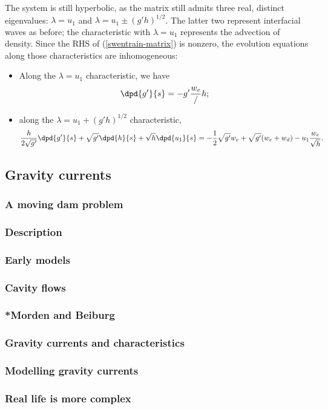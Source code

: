 The system is still hyperbolic, as the matrix still admits three real, distinct eigenvalues: $\lambda = u_1$ and $\lambda = u_1 \pm (g'h)^{1/2}$. The latter two represent interfacial waves as before; the characteristic with $\lambda = u_1$ represents the advection of density. Since the RHS of (\ref{swentrain-matrix}) is nonzero, the evolution equations along those characteristics are inhomogeneous:
\begin{itemize}
	\item Along the $\lambda = u_1$ characteristic, we have
	\begin{equation}
		\dpd{g'}{s} = -g' \frac{w_e}/h;
	\end{equation}
	\item along the $\lambda = u_1 + (g'h)^{1/2}$ characteristic,
	\begin{equation}
		\frac{h}{2\sqrt{g'}} \dpd{g'}{s} + \sqrt{g'} \dpd{h}{s} + \sqrt{h} \dpd{u_1}{s}
		 = -\frac{1}{2}\sqrt{g'} w_e + \sqrt{g'} (w_e + w_d) - u_1 \frac{w_e}{\sqrt{h}}.
	\end{equation}
\end{itemize}


\subsection{Gravity currents}
\subsubsection{A moving dam problem}
\subsubsection{Description}
\subsubsection{Early models}
\subsubsection{Cavity flows}
\subsubsection{*Morden and Beiburg}
\subsubsection{Gravity currents and characteristics}
\subsubsection{Modelling gravity currents}
\subsubsection{Real life is more complex}